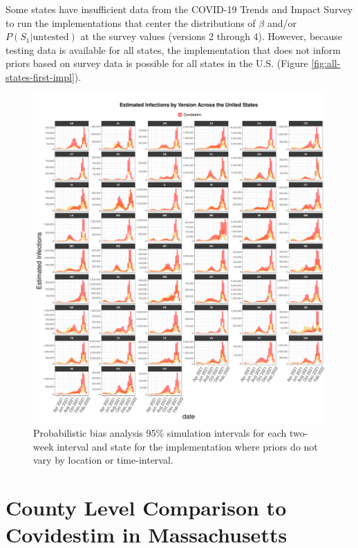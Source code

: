 \documentclass[12pt,twoside]{smiththesis}
\begin{document}
Some states have insufficient data from the COVID-19 Trends and Impact Survey to run the implementations that center the distributions of \(\beta\) and/or \(P(S_1|\text{untested})\) at the survey values (versions 2 through 4). However, because testing data is available for all states, the implementation that does not inform priors based on survey data is possible for all states in the U.S. (Figure \ref{fig:all-states-first-impl}).
\begin{figure}

{\centering \includegraphics[width=1\linewidth]{figure/all-states-first-impl} 

}

\caption{\label{fig:all-states-first-impl}  Probabilistic bias analysis 95\% simulation intervals for each two-week interval and state for the implementation where priors do not vary by location or time-interval.}\label{fig:unnamed-chunk-116}
\end{figure}
\hypertarget{county-level-comparison-to-covidestim-in-massachusetts}{%
\section{County Level Comparison to Covidestim in Massachusetts}\label{county-level-comparison-to-covidestim-in-massachusetts}}
\end{document}
